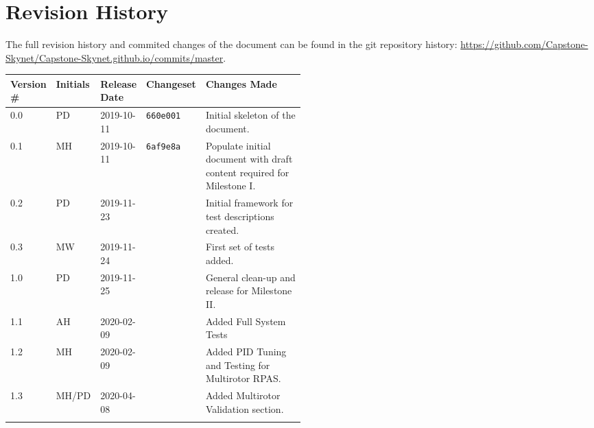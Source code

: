 \section*{Revision History}
The full revision history and commited changes of the document can be found in the git repository history: \href{https://github.com/Capstone-Skynet/Capstone-Skynet.github.io}{https://github.com/Capstone-Skynet/Capstone-Skynet.github.io/commits/master}.

\begin{table}[H]
\begin{tabular}{*{4}{l}p{0.5\linewidth}}
\hline
Version \# & Initials & Release Date & Changeset & Changes Made \\ \hline

0.0 & PD & 2019-10-11 & \texttt{660e001} & Initial skeleton of the document.\\
0.1 & MH & 2019-10-11 & \texttt{6af9e8a} & Populate initial document with draft content required for Milestone I.\\
0.2 & PD & 2019-11-23 & & Initial framework for test descriptions created.\\
0.3 & MW & 2019-11-24 & & First set of tests added.\\
1.0 & PD & 2019-11-25 & & General clean-up and release for Milestone II.\\
1.1 & AH & 2020-02-09 & & Added Full System Tests \\
1.2 & MH & 2020-02-09 & & Added PID Tuning and Testing for Multirotor RPAS. \\
1.3 & MH/PD & 2020-04-08 & & Added Multirotor Validation section. \\

 & & & \\ \hline
\end{tabular}
\end{table}